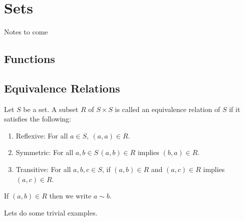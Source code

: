 \chapter{Sets}

Notes to come

\section{Functions}

\section{Equivalence Relations}

 Let \(S\) be a set. A subset \(R\) of \(S \times S\) is called an equivalence relation of \(S\) if it satisfies the following:

\begin{enumerate}
    \item Reflexive: For all \(a \in S,\ (a,a) \in R\).
    \item Symmetric: For all \(a, b \in S\, (a,b) \in R\) implies \((b,a) \in R\).
    \item Transitive: For all \(a, b, c \in S\), if \((a,b) \in R\) and \((a,c) \in R\) implies \((a,c) \in R\).
\end{enumerate}
If \((a,b) \in R\) then we write \(a \sim b\).

Lets do some trivial examples.

